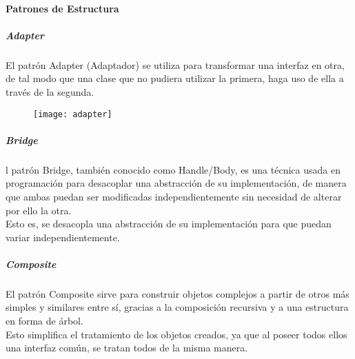 \paragraph{Patrones de Estructura}
\subparagraph{Adapter}
El patrón Adapter (Adaptador) se utiliza para transformar una interfaz en otra, de tal modo que una clase que no pudiera utilizar la primera, haga uso de ella a través de la segunda.
\begin{figure}[h!]
  \centering{}
    \texttt{[image: adapter]}
\end{figure}
\subparagraph{Bridge}
l patrón Bridge, también conocido como Handle/Body, es una técnica usada en programación para desacoplar una abstracción de su implementación, de manera que ambas puedan ser modificadas independientemente sin necesidad de alterar por ello la otra.\\
Esto es, se desacopla una abstracción de su implementación para que puedan variar independientemente.\\
\vspace*{\fill}
\noindent{}
\subparagraph{Composite}
El patrón Composite sirve para construir objetos complejos a partir de otros más simples y similares entre sí, gracias a la composición recursiva y a una estructura en forma de árbol.\\
Esto simplifica el tratamiento de los objetos creados, ya que al poseer todos ellos una interfaz común, se tratan todos de la misma manera.\\
\vspace*{\fill}
\noindent{}
